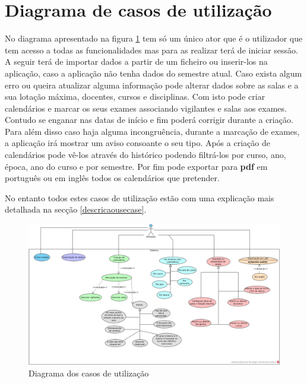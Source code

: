 \documentclass[11pt, twoside]{report}
\begin{document}
	\section{Diagrama de casos de utilização}
	\label{diagrama}
	
	No diagrama apresentado na figura \ref{usecasediagram} tem só um único ator que é o utilizador que tem acesso a todas as funcionalidades mas para as realizar terá de iniciar sessão.
	A seguir terá de importar dados a partir de um ficheiro ou inserir-los na aplicação, caso a aplicação não tenha dados do semestre atual.
	Caso exista algum erro ou queira atualizar alguma informação pode alterar dados sobre as salas e a sua lotação máxima, docentes, cursos e disciplinas.
	Com isto pode criar calendários e marcar os seus exames associando vigilantes e salas aos exames.
	Contudo se enganar nas datas de início e fim poderá corrigir durante a criação.
	Para além disso caso haja alguma incongruência, durante a marcação de exames, a aplicação irá mostrar um aviso consoante o seu tipo.
	Após a criação de calendários pode vê-los através do histórico podendo filtrá-los por curso, ano, época, ano do curso e por semestre.
	Por fim pode exportar para \textbf{pdf} em português ou em inglês todos os calendários que pretender.
	
	No entanto todos estes casos de utilização estão com uma explicação mais detalhada na secção \ref{descricaousecase}.
	
	
\clearpage
\begin{landscape}
	\pagestyle{empty}
	
		\begin{figure}[H] 
			\centering 			\includegraphics[width=1.3\textwidth,height=1.3\textheight,keepaspectratio]{image/diagrama}
			\caption{Diagrama dos casos de utilização}
			\label{usecasediagram}
		
		\end{figure}
\end{landscape}
\end{document}
